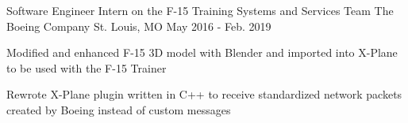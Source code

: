 \begin{cventries}
  \cventry
    {Software Engineer Intern on the F-15 Training Systems and Services Team} %
    {The Boeing Company} %
    {St. Louis, MO} %
    {May 2016 - Feb. 2019} %
    {
      \begin{cvitems} %
        \item {Modified and enhanced F-15 3D model with Blender and imported into X-Plane to be used with the F-15 Trainer}
        \item {Rewrote X-Plane plugin written in C++ to receive standardized network packets created by Boeing instead of custom messages}
      \end{cvitems}
    }

\end{cventries}
